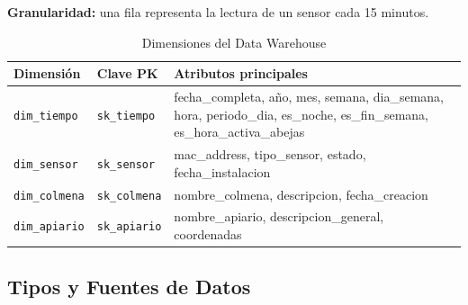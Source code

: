 \textbf{Granularidad:} una fila representa la lectura de un sensor cada 15 minutos.

\begin{table}[h!]
  \centering
  \caption{Dimensiones del Data Warehouse}
  \begin{tabularx}{\textwidth}{llX}
    \toprule
    \textbf{Dimensi\'on} & \textbf{Clave PK} & \textbf{Atributos principales} \\
    \midrule
    \texttt{dim\_tiempo}  & \texttt{sk\_tiempo}  & fecha\_completa, a\~no, mes, semana, dia\_semana, hora, periodo\_dia, es\_noche, es\_fin\_semana, es\_hora\_activa\_abejas \\
    \texttt{dim\_sensor}  & \texttt{sk\_sensor}  & mac\_address, tipo\_sensor, estado, fecha\_instalacion \\
    \texttt{dim\_colmena} & \texttt{sk\_colmena} & nombre\_colmena, descripcion, fecha\_creacion \\
    \texttt{dim\_apiario} & \texttt{sk\_apiario} & nombre\_apiario, descripcion\_general, coordenadas \\
    \bottomrule
  \end{tabularx}
\end{table}

\subsection{Tipos y Fuentes de Datos}


